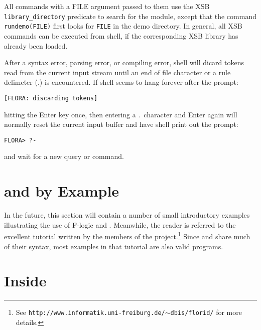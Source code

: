\documentclass[11pt]{report}
\begin{document}
\addtocounter{footnote}{-3}
\addtocounter{footnote}{1}
\addtocounter{footnote}{1}
\addtocounter{footnote}{1}

All commands with a FILE argument passed to them use the XSB {\tt library\_directory}
predicate to search for the module, except that the command {\tt rundemo(FILE)}
first looks for {\tt FILE} in the \FLORA demo directory. In general, all XSB commands
can be executed from \FLORA shell, if the corresponding XSB library has already been
loaded.

After a syntax error, parsing error, or compiling error, \FLORA shell will dicard tokens
read from the current input stream until an end of file character or a rule delimeter (.) is
encountered. If \FLORA shell seems to hang forever after the prompt:
\begin{verbatim}
[FLORA: discarding tokens]
\end{verbatim}
hitting the Enter key once, then entering a .\ character and Enter again will normally reset
the current input buffer and have \FLORA shell print out the prompt:
\begin{verbatim}
FLORA> ?-
\end{verbatim}
and wait for a new query or command.

 
\section{\fl and \FLORA by Example}

In the future, this section will contain a number of small
introductory examples illustrating the use of F-logic and \FLORA. Meanwhile, the
reader is referred to the excellent tutorial written by the members of the
\FLORID project.\footnote{
  See {\tt http://www.informatik.uni-freiburg.de/$\sim$dbis/florid/} for more
  details.
  }
Since \FLORA and \FLORID share much of their syntax, most examples in that
tutorial are also valid \FLORA programs.



\section{Inside \FLORA}
\end{document}
